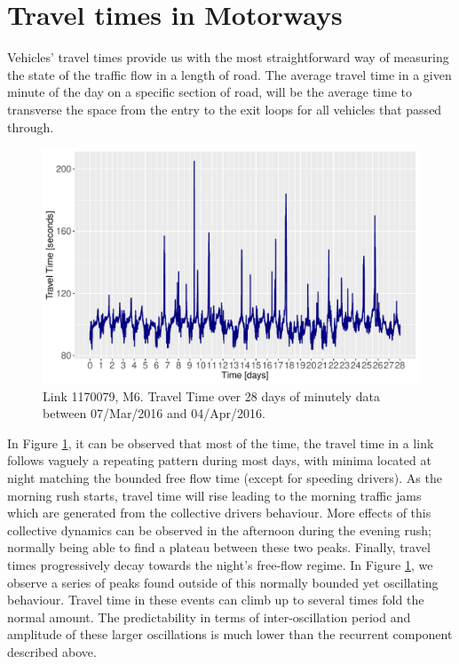 \documentclass[a4paper, 10pt, conference]{ieeeconf}      %
\begin{document}
\section{Travel times in Motorways} \label{Travel times in Motorways}
Vehicles' travel times provide us with the most straightforward way of measuring the state of the traffic flow in a length of road.
The average travel time in a given minute of the day on a specific section of road, will be the average time to transverse the space from the entry to the exit loops for all vehicles that passed through.
\begin{figure}[htbp]
\centerline{\includegraphics[width=\linewidth]{./images/Travel_Time.pdf}}
\caption{Link 1170079, M6. Travel Time over 28 days of minutely data between 07/Mar/2016 and 04/Apr/2016.}
\label{fig:travel_time}
\end{figure}
In Figure \ref{fig:travel_time}, it can be observed that most of the time, the travel time in a link follows vaguely a repeating pattern during most days, with minima located at night matching the bounded free flow time (except for speeding drivers).
As the morning rush starts, travel time will rise leading to the morning traffic jams which are generated from the collective drivers behaviour.
More effects of this collective dynamics can be observed in the afternoon during the evening rush; normally being able to find a plateau between these two peaks.
Finally, travel times progressively decay towards the night's free-flow regime.
In Figure \ref{fig:travel_time}, we observe a series of peaks found outside of this normally bounded yet oscillating behaviour. 
Travel time in these events can climb up to several times fold the normal amount.
The predictability in terms of inter-oscillation period and amplitude of these larger oscillations is much lower than the recurrent component described above.
\end{document}
